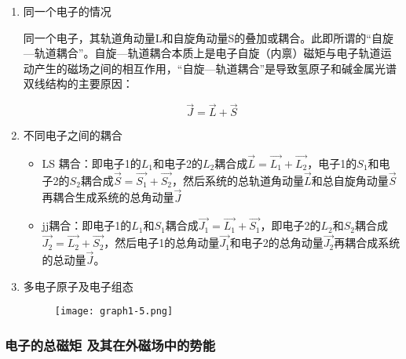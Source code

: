 \documentclass[dvipsnames, svgnames,a4paper,11pt]{article}
\begin{document}
		\begin{enumerate}
			\item 同一个电子的情况

				同一个电子，其轨道角动量L和自旋角动量S的叠加或耦合。此即所谓的“自旋—轨道耦合”。自旋—轨道耦合本质上是电子自旋（内禀）磁矩与电子轨道运动产生的磁场之间的相互作用，“自旋—轨道耦合”是导致氢原子和碱金属光谱双线结构的主要原因：

					\[
						\vec{J}=\vec{L}+\vec{S}	
					\]

			\item 不同电子之间的耦合

				\begin{itemize}
					\item LS 耦合：即电子1的$L_1$和电子2的$L_2$耦合成$\vec{L}=\vec{L_1}+\vec{L_2}$，电子1的$S_1$和电子2的$S_2$耦合成$\vec{S}=\vec{S_1}+\vec{S_2}$，然后系统的总轨道角动量$\vec{L}$和总自旋角动量$\vec{S}$再耦合生成系统的总角动量$\vec{J}$
					
					\item jj耦合：即电子1的$L_1$和$S_1$耦合成$\vec{J_1}=\vec{L_1}+\vec{S_1}$，即电子2的$L_2$和$S_2$耦合成$\vec{J_2}=\vec{L_2}+\vec{S_2}$，然后电子1的总角动量$\vec{J_1}$和电子2的总角动量$\vec{J_2}$再耦合成系统的总动量$\vec{J}$。
				\end{itemize}

			\item 多电子原子及电子组态
			
				\begin{figure}[H]
					\centering
					\texttt{[image: graph1-5.png]}
					\label{fig:graph1-5}
				\end{figure}
				
				
		\end{enumerate}



	\subsubsection{电子的总磁矩 及其在外磁场中的势能}
\end{document}
